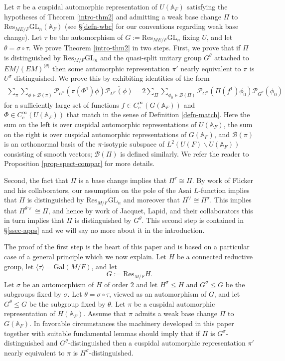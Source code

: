 \documentclass[12pt]{amsart}
\theoremstyle{remark}
\numberwithin{equation}{section}
\newcommand{\A}{\mathbb{A}}
\newcommand{\GL}{\mathrm{GL}}
\newcommand{\Gal}{\mathrm{Gal}}
\theoremstyle{definition}
\numberwithin{equation}{subsection}
\begin{document}
Let $\pi$ be a cuspidal automorphic representation of $U(\A_F)$ satisfying the hypotheses of Theorem \ref{intro-thm2} and
admitting a weak base change $\Pi$ to
$\mathrm{Res}_{ME/F}\GL_{n}(\A_{F})$ (see \S \ref{defn-wbc} for our
conventions regarding weak base change).  Let $\tau$ be the automorphism of $G:=\mathrm{Res}_{ME/F}\GL_n$ fixing $U$, and let $\theta=\sigma \circ \tau$.  We prove Theorem \ref{intro-thm2} in two steps.  First, we prove that if $\Pi$ is
distinguished by $\mathrm{Res}_{M/F}\GL_{n}$ and the quasi-split unitary group $G^{\theta}$ attached to $EM/(EM)^{\langle \theta\rangle}$ then
some automorphic representation
 $\pi'$ nearly equivalent to $\pi$ is $U^{\sigma}$ distinguished.
We prove this by exhibiting identities of the form
\begin{align*}
\sum_{\pi} \sum_{\phi \in \mathcal{B}(\pi)} \mathcal{P}_{U^{\sigma}}(\pi(\Phi^1)\phi)\overline{\mathcal{P}_{U^{\sigma}}(\phi)}=2\sum_{\Pi}\sum_{\phi_0 \in \mathcal{B}(\Pi)}\mathcal{P}_{G^{\sigma}}(\Pi(f^1)\phi_0)\overline{\mathcal{P}_{G^{\theta}}(\phi_0)}
\end{align*}
 for a sufficiently large set of functions $f \in C_c^{\infty}(G(\A_F))$ and $\Phi \in C_c^{\infty}(U(\A_F))$ that match in the sense of Definition \ref{defn-match}.  Here the sum on the left is over cuspidal automorphic representations of $U(\A_F)$, the sum on the right is over cuspidal automorphic representations of $G(\A_F)$, and $\mathcal{B}(\pi)$ is an orthonormal basis of the $\pi$-isotypic subspace of $L^2(U(F) \backslash U(\A_F))$ consisting of smooth vectors; $\mathcal{B}(\Pi)$ is defined similarly.  We refer the reader to Proposition \ref{prop-spect-compar} for more details.


 Second, the fact that $\Pi$ is a base change implies that $\Pi^{\tau} \cong \Pi$.  By work of
Flicker and his collaborators, our assumption on the pole of the Asai $L$-function implies that $\Pi$ is distinguished by
$\mathrm{Res}_{M/F}\GL_{n}$ and moreover that $\Pi^{\vee} \cong \Pi^{\sigma}$.  This implies that $\Pi^{\theta \vee} \cong \Pi$, and hence by work of Jacquet,
 Lapid, and their collaborators this in turn implies that $\Pi$ is distinguished by $G^{\theta}$. This second step is contained in \S \ref{ssec-apps} and we will say no more about
it in the introduction.

The proof of the first step is the heart of this paper and is based on a particular case of a general principle which we now explain.
Let $H$ be a connected reductive group, let $\langle \tau \rangle=\Gal(M/F)$, and let
$$
G:=\mathrm{Res}_{M/F}H.
$$
Let $\sigma$ be an automorphism of $H$ of order $2$ and let $H^{\sigma} \leq H$ and $G^{\sigma} \leq G$ be the subgroups fixed by $\sigma$.  Let $\theta=\sigma \circ \tau$, viewed as an automorphism of $G$, and let $G^{\theta} \leq G$ be the subgroup fixed by $\theta$. Let $\pi$ be a cuspidal automorphic representation of $H(\A_F)$.  Assume that $\pi$ admits a weak base change $\Pi$ to $G(\A_F)$.
In favorable circumstances the machinery developed in this paper together with suitable fundamental lemmas should imply that
if $\Pi$ is $G^{\sigma}$-distinguished and $G^{\theta}$-distinguished then a cuspidal automorphic representation $\pi'$ nearly equivalent to $\pi$ is $H^{\sigma}$-distinguished.
\end{document}
